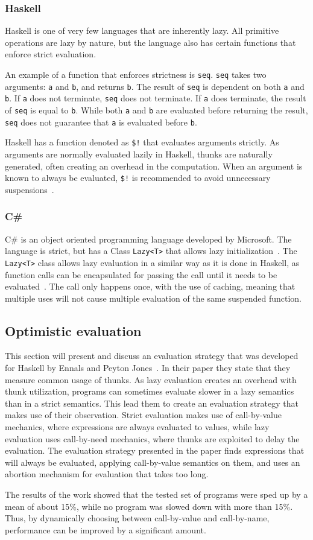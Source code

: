 \subsubsection{Haskell}
Haskell is one of very few languages that are inherently lazy. All primitive
operations are lazy by nature, but the language also has certain functions that
enforce strict evaluation.

An example of a function that enforces strictness is \texttt{seq}. \texttt{seq}
takes two arguments: \texttt{a} and \texttt{b}, and returns \texttt{b}. The
result of \texttt{seq} is dependent on both \texttt{a} and \texttt{b}. If
\texttt{a} does not terminate, \texttt{seq} does not terminate. If \texttt{a}
does terminate, the result of \texttt{seq} is equal to \texttt{b}. While both
\texttt{a} and \texttt{b} are evaluated before returning the result,
\texttt{seq} does not guarantee that \texttt{a} is evaluated before \texttt{b}.

Haskell has a function denoted as \texttt{\$!} that evaluates arguments strictly.
As arguments are normally evaluated lazily in Haskell, thunks are naturally
generated, often creating an overhead in the computation. When an argument is
known to always be evaluated, \texttt{\$!} is recommended to avoid unnecessary
suspensions~\cite{Performa16:online}.

\subsubsection{C\#}
C\# is an object oriented programming language developed by Microsoft. The
language is strict, but has a Class \texttt{Lazy<T>} that allows lazy
initialization~\cite{LazyTCla1:online}. The \texttt{Lazy<T>} class allows
lazy evaluation in a similar way as it is done in Haskell, as
function calls can be encapsulated for passing the call until it needs to be
evaluated~\cite{csharp}. The call only happens once, with the use of caching,
meaning that multiple uses will not cause multiple evaluation of the same
suspended function.


\subsection{Optimistic evaluation}

This section will present and discuss an evaluation strategy that was developed
for Haskell by Ennals and Peyton Jones~\cite{Ennals:2003:OEA:944746.944731}.
In their paper they state that they measure common usage of thunks. As lazy
evaluation creates an overhead with thunk utilization, programs can sometimes
evaluate slower in a lazy semantics than in a strict semantics. This lead
them to create an evaluation strategy that makes use of their observation.
Strict evaluation makes use of call-by-value mechanics, where expressions are
always evaluated to values, while lazy evaluation uses call-by-need mechanics,
where thunks are exploited to delay the evaluation. The evaluation strategy
presented in the paper finds expressions that will always be evaluated, applying
call-by-value semantics on them, and uses an abortion mechanism for evaluation
that takes too long.

The results of the work showed that the tested set of programs were sped up by
a mean of about 15\%, while no program was slowed down with more than 15\%.
Thus, by dynamically choosing between call-by-value and call-by-name,
performance can be improved by a significant amount.
